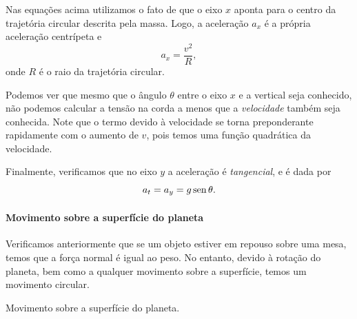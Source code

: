 \noindent{}Nas equações acima utilizamos o fato de que o eixo $x$ aponta para o centro da trajetória circular descrita pela massa. Logo, a aceleração $a_x$ é a própria aceleração centrípeta e
\begin{equation}
    a_x = \frac{v^2}{R},
\end{equation}
%
onde $R$ é o raio da trajetória circular.

Podemos ver que mesmo que o ângulo $\theta$ entre o eixo $x$ e a vertical seja conhecido, não podemos calcular a tensão na corda a menos que a \emph{velocidade} também seja conhecida. Note que o termo devido à velocidade se torna preponderante rapidamente com o aumento de $v$, pois temos uma função quadrática da velocidade. 

Finalmente, verificamos que no eixo $y$ a aceleração é \emph{tangencial}, e é dada por
\begin{equation}
    a_t = a_y = g\operatorname{sen}\theta.
\end{equation}

\paragraph{Movimento sobre a superfície do planeta}

Verificamos anteriormente que se um objeto estiver em repouso sobre uma mesa, temos que a força normal é igual ao peso. No entanto, devido à rotação do planeta, bem como a qualquer movimento sobre a superfície, temos um movimento circular.

\begin{marginfigure}
\centering
{}
\caption{Movimento sobre a superfície do planeta.}
\end{marginfigure}

